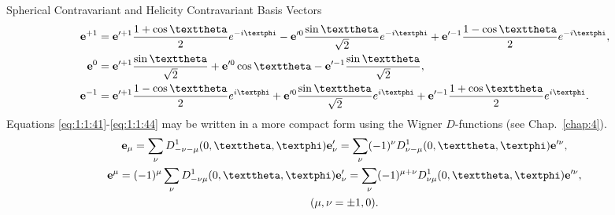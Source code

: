 Spherical Contravariant and Helicity Contravariant Basis Vectors
\begin{align}
\vect{e}^{+1} & =\vect{e}^{\prime+1} \frac{1+\cos \vartheta}{2} e^{-i \varphi}-\vect{e}^{\prime 0} \frac{\sin \vartheta}{\sqrt{2}} e^{-i \varphi}+\vect{e}^{\prime-1} \frac{1-\cos \vartheta}{2} e^{-i \varphi},  \notag\\
\vect{e}^{0} & =\vect{e}^{\prime+1} \frac{\sin \vartheta}{\sqrt{2}}+\vect{e}^{\prime 0} \cos \vartheta-\vect{e}^{\prime-1} \frac{\sin \vartheta}{\sqrt{2}},  \label{eq:1:1:44}\\
\vect{e}^{-1} & =\vect{e}^{\prime+1} \frac{1-\cos \vartheta}{2} e^{i \varphi}+\vect{e}^{\prime 0} \frac{\sin \vartheta}{\sqrt{2}} e^{i \varphi}+\vect{e}^{\prime-1} \frac{1+\cos \vartheta}{2} e^{i \varphi} . \notag
\end{align}
Equations \eqref{eq:1:1:41}-\eqref{eq:1:1:44} may be written in a more compact form using the Wigner \(D\)-functions (see Chap.~\ref{chap:4}).
\begin{gather}
\vect{e}_{\mu}=\sum_{\nu} D_{-\nu-\mu}^{1}(0, \vartheta, \varphi) \vect{e}_{\nu}^{\prime}=\sum_{\nu}(-1)^{\nu} D_{\nu-\mu}^{1}(0, \vartheta, \varphi) \vect{e}^{\prime \nu},  \notag\\
\vect{e}^{\mu}=(-1)^{\mu} \sum_{\nu} D_{-\nu \mu}^{1}(0, \vartheta, \varphi) \vect{e}_{\nu}^{\prime}=\sum_{\nu}(-1)^{\mu+\nu} D_{\nu \mu}^{1}(0, \vartheta, \varphi) \vect{e}^{\prime \nu} , \label{eq:1:1:45}\\
(\mu, \nu= \pm 1,0) .\notag
\end{gather}
